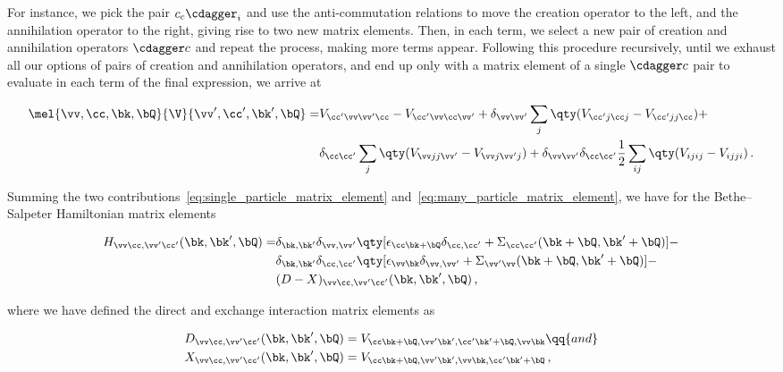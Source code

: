 \noindent For instance, we pick the pair $c_c \cdagger_i$ and use the anti-commutation relations to move the creation operator to the left, and the annihilation operator to the right, giving rise to two new matrix elements.
Then, in each term, we select a new pair of creation and annihilation operators $\cdagger c$ and repeat the process, making more terms appear.
Following this procedure recursively, until we exhaust all our options of pairs of creation and annihilation operators, and end up only with a matrix element of a single $\cdagger c$ pair to evaluate in each term of the final expression, we arrive at

\begin{equation}
    \label{eq:many_particle_matrix_element}
    \begin{aligned}
        \mel{\vv,\cc ,\bk,\bQ}{\V}{\vv ', \cc ',\bk',\bQ} = &V_{\cc '\vv \vv '\cc } - V_{\cc '\vv \cc  \vv '} + \delta_{\vv \vv '} \sum_j \qty(V_{\cc 'j\cc j} - V_{\cc 'jj\cc }) + \\
        & \delta_{\cc  \cc '} \sum_j \qty(V_{\vv jj\vv '} - V_{\vv j\vv 'j}) + \delta_{\vv \vv '} \delta_{\cc  \cc '} \frac{1}{2} \sum_{ij} \qty(V_{ijij} - V_{ijji})\,.
    \end{aligned}
\end{equation}


\noindent Summing the two contributions~\eqref{eq:single_particle_matrix_element} and~\eqref{eq:many_particle_matrix_element}, we have for the Bethe--Salpeter Hamiltonian matrix elements

\begin{equation}
    \label{eq:BSE_Hamiltonian_matrix_elements}
    \begin{aligned}
        H_{\vv \cc , \vv ' \cc '}(\bk,\bk',\bQ) = &\delta_{\bk,\bk'} \delta_{\vv, \vv '} \qty[\epsilon_{\cc  \bk + \bQ}  \delta_{\cc , \cc '} + \Sigma_{\cc  \cc '}(\bk + \bQ, \bk' + \bQ)] - \\
        &\delta_{\bk,\bk'} \delta_{\cc , \cc '} \qty[\epsilon_{\vv \bk}  \delta_{\vv, \vv '} + \Sigma_{\vv ' \vv }(\bk + \bQ, \bk' + \bQ)] - \\
        &(D - X)_{\vv \cc , \vv ' \cc '}(\bk,\bk',\bQ)\,,
    \end{aligned}
\end{equation}

\noindent where we have defined the direct and exchange interaction matrix elements as

\begin{subequations}
    \label{eq:direct_and_exchange_terms}
    \begin{align}
        D_{\vv \cc , \vv ' \cc '}(\bk,\bk',\bQ) &= V_{\cc \bk + \bQ,\vv '\bk', \cc '\bk' + \bQ, \vv \bk} \label{subeq:direct_term} \qq{and}\\
        X_{\vv \cc , \vv ' \cc '}(\bk,\bk',\bQ) &= V_{\cc \bk + \bQ,\vv '\bk', \vv \bk, \cc '\bk' + \bQ}\,, \label{sub eq:exchange_term}
    \end{align}
\end{subequations}


